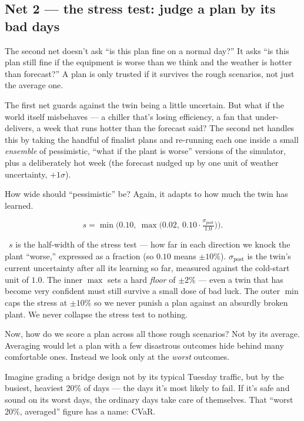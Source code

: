\documentclass[11pt]{report}
\newcommand{\plainwords}[1]{\par\smallskip\noindent{\itshape In plain words.}~#1\par\smallskip}
\begin{document}
\subsection{Net 2 --- the stress test: judge a plan by its bad days}

\begin{keyidea}
The second net doesn't ask ``is this plan fine on a normal day?'' It asks ``is this plan still fine if the equipment is worse than we think and the weather is hotter than forecast?'' A plan is only trusted if it survives the rough scenarios, not just the average one.
\end{keyidea}

The first net guards against the twin being a little uncertain. But what if the world itself misbehaves --- a chiller that's losing efficiency, a fan that under-delivers, a week that runs hotter than the forecast said? The second net handles this by taking the handful of finalist plans and re-running each one inside a small \emph{ensemble} of pessimistic, ``what if the plant is worse'' versions of the simulator, plus a deliberately hot week (the forecast nudged up by one unit of weather uncertainty, $+1\sigma$).

How wide should ``pessimistic'' be? Again, it adapts to how much the twin has learned.

\begin{equation}\label{eq:ensemble}
s = \min\!\Big(0.10,\ \max\big(0.02,\ 0.10\cdot \tfrac{\sigma_{\text{post}}}{1.0}\big)\Big).
\end{equation}
\plainwords{$s$ is the half-width of the stress test --- how far in each direction we knock the plant ``worse,'' expressed as a fraction (so $0.10$ means $\pm 10\%$). $\sigma_{\text{post}}$ is the twin's current uncertainty after all its learning so far, measured against the cold-start unit of $1.0$. The inner $\max$ sets a hard \emph{floor} of $\pm 2\%$ --- even a twin that has become very confident must still survive a small dose of bad luck. The outer $\min$ caps the stress at $\pm 10\%$ so we never punish a plan against an absurdly broken plant. We never collapse the stress test to nothing.}

Now, how do we score a plan across all those rough scenarios? Not by its average. Averaging would let a plan with a few disastrous outcomes hide behind many comfortable ones. Instead we look only at the \emph{worst} outcomes.

\begin{analogy}
Imagine grading a bridge design not by its typical Tuesday traffic, but by the busiest, heaviest 20\% of days --- the days it's most likely to fail. If it's safe and sound on its worst days, the ordinary days take care of themselves. That ``worst 20\%, averaged'' figure has a name: CVaR.
\end{analogy}
\end{document}

